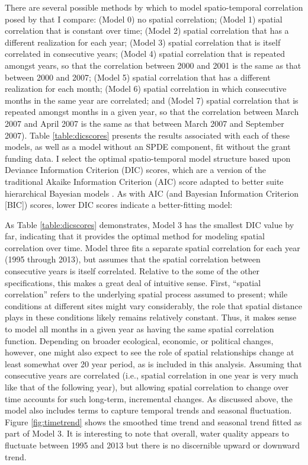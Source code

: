 \documentclass[11pt,a4paper,titlepage]{article}
\begin{document}
There are several possible methods by which to model spatio-temporal correlation posed by \textcite{cosandey-godin2014} that I compare: (Model 0) no spatial correlation; (Model 1) spatial correlation that is constant over time; (Model 2) spatial correlation that has a different realization for each year; (Model 3) spatial correlation that is itself correlated in consecutive years; (Model 4) spatial correlation that is repeated amongst years, so that the correlation between 2000 and 2001 is the same as that between 2000 and 2007; (Model 5) spatial correlation that has a different realization for each month; (Model 6) spatial correlation in which consecutive months in the same year are correlated; and (Model 7) spatial correlation that is repeated amongst months in a given year, so that the correlation between March 2007 and April 2007 is the same as that between March 2007 and September 2007). Table \ref{table:dicscores} presents the results associated with each of these models, as well as a model without an SPDE component, fit without the grant funding data. I select the optimal spatio-temporal model structure based upon Deviance Information Criterion (DIC) scores, which are a version of the traditional Akaike Information Criterion (AIC) score adapted to better suite hierarchical Bayesian models \parencite{ward2008,speigelhalter2002}. As with AIC (and Bayesian Information Criterion [BIC]) scores, lower DIC scores indicate a better-fitting model:



As Table \ref{table:dicscores} demonstrates, Model 3 has the smallest DIC value by far, indicating that it provides the optimal method for modeling spatial correlation over time. Model three fits a separate spatial correlation for each year (1995 through 2013), but assumes that the spatial correlation between consecutive years is itself correlated. Relative to the some of the other specifications, this makes a great deal of intuitive sense. First, “spatial correlation” refers to the underlying spatial process assumed to present; while conditions at different sites might vary considerably, the role that spatial distance plays in these conditions likely remains relatively constant. Thus, it makes sense to model all months in a given year as having the same spatial correlation function. Depending on broader ecological, economic, or political changes, however, one might also expect to see the role of spatial relationships change at least somewhat over 20 year period, as is included in this analysis. Assuming that consecutive years are correlated (i.e., spatial correlation in one year is very much like that of the following year), but allowing spatial correlation to change over time accounts for such long-term, incremental changes. As discussed above, the model also includes terms to capture temporal trends and seasonal fluctuation. Figure \ref{fig:timetrend} shows the smoothed time trend and seasonal trend fitted as part of Model 3. It is interesting to note that overall, water quality appears to fluctuate between 1995 and 2013 but there is no discernible upward or downward trend. 
\end{document}

